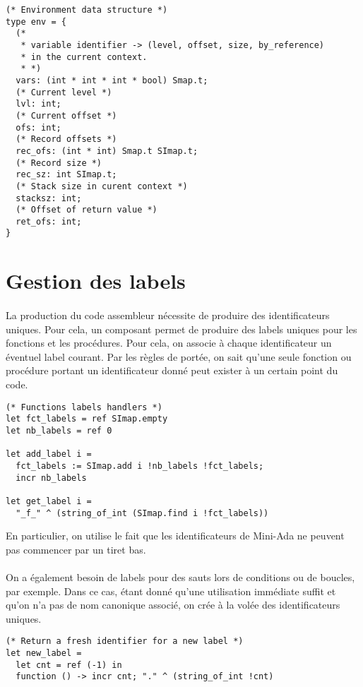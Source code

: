 \documentclass[a4paper,12pt]{article}
\begin{document}
\begin{lstlisting}
(* Environment data structure *)
type env = {
  (* 
   * variable identifier -> (level, offset, size, by_reference)
   * in the current context.
   * *)
  vars: (int * int * int * bool) Smap.t;
  (* Current level *)
  lvl: int;
  (* Current offset *)
  ofs: int;
  (* Record offsets *)
  rec_ofs: (int * int) Smap.t SImap.t;
  (* Record size *)
  rec_sz: int SImap.t;
  (* Stack size in curent context *)
  stacksz: int;
  (* Offset of return value *) 
  ret_ofs: int;
}
\end{lstlisting}

\section{Gestion des labels}

\paragraph*{}
La production du code assembleur nécessite de produire des identificateurs uniques. Pour cela, un composant permet de
produire des labels uniques pour les fonctions et les procédures. Pour cela, on associe à chaque identificateur un
éventuel label courant. Par les règles de portée, on sait qu'une seule fonction ou procédure portant un identificateur
donné peut exister à un certain point du code.

\begin{lstlisting}
(* Functions labels handlers *)
let fct_labels = ref SImap.empty
let nb_labels = ref 0

let add_label i =
  fct_labels := SImap.add i !nb_labels !fct_labels;
  incr nb_labels

let get_label i =
  "_f_" ^ (string_of_int (SImap.find i !fct_labels))
\end{lstlisting}

En particulier, on utilise le fait que les identificateurs de Mini-Ada ne peuvent pas commencer par un tiret bas.

\paragraph*{}
On a également besoin de labels pour des sauts lors de conditions ou de boucles, par exemple. Dans ce cas, étant
donné qu'une utilisation immédiate suffit et qu'on n'a pas de nom canonique associé, on crée à la volée des
identificateurs uniques.

\begin{lstlisting}
(* Return a fresh identifier for a new label *)
let new_label =
  let cnt = ref (-1) in
  function () -> incr cnt; "." ^ (string_of_int !cnt)
\end{lstlisting}
\end{document}
